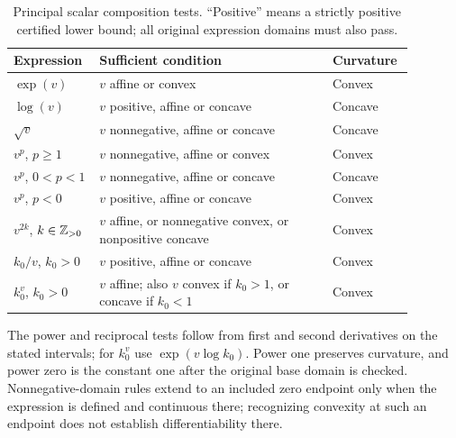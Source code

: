 \begin{table}[htbp]
\centering\small
\caption{Principal scalar composition tests. ``Positive'' means a strictly positive certified lower bound; all original expression domains must also pass.}
\label{tab:composition}
\begin{tabular}{p{0.19\linewidth}p{0.55\linewidth}p{0.14\linewidth}}
\toprule
Expression & Sufficient condition & Curvature\\
\midrule
$\exp(v)$ & $v$ affine or convex & Convex\\
$\log(v)$ & $v$ positive, affine or concave & Concave\\
$\sqrt v$ & $v$ nonnegative, affine or concave & Concave\\
$v^p$, $p\geq1$ & $v$ nonnegative, affine or convex & Convex\\
$v^p$, $0<p<1$ & $v$ nonnegative, affine or concave & Concave\\
$v^p$, $p<0$ & $v$ positive, affine or concave & Convex\\
$v^{2k}$, $k\in\mathbb{Z}_{>0}$ & $v$ affine, or nonnegative convex, or nonpositive concave & Convex\\
$k_0/v$, $k_0>0$ & $v$ positive, affine or concave & Convex\\
$k_0^v$, $k_0>0$ & $v$ affine; also $v$ convex if $k_0>1$, or concave if $k_0<1$ & Convex\\
\bottomrule
\end{tabular}
\end{table}
The power and reciprocal tests follow from first and second derivatives on the stated intervals; for $k_0^v$ use $\exp(v\log k_0)$. Power one preserves curvature, and power zero is the constant one after the original base domain is checked. Nonnegative-domain rules extend to an included zero endpoint only when the expression is defined and continuous there; recognizing convexity at such an endpoint does not establish differentiability there.

